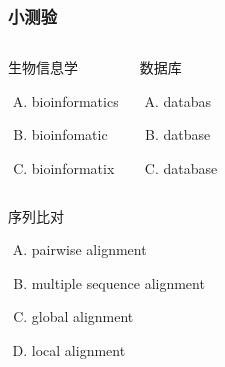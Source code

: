 \begin{frame}
  \frametitle{小测验}
  \begin{columns}
    \begin{block}{生物信息学}
      \begin{enumerate}[(A)]
        \item bioinformatics
        \item bioinfomatic
        \item bioinformatix
      \end{enumerate}
    \end{block}
    \pause
    \begin{block}{数据库}
      \begin{enumerate}[(A)]
        \item databas
        \item datbase
        \item database
      \end{enumerate}
    \end{block}
  \end{columns}
  \pause
  \begin{columns}
    \begin{block}{序列比对}
      \begin{enumerate}[(A)]
        \item pairwise alignment
        \item multiple sequence alignment
        \item global alignment
        \item local alignment
      \end{enumerate}
    \end{block}
  \end{columns}
\end{frame}
